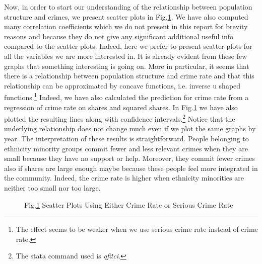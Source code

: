 \documentclass[a4paper,12pt]{article}
\begin{document}
\noindent
Now, in order to start our understanding of the relationship between population structure and crimes, we present scatter plots in Fig.\ref{scatters}. We have also computed many correlation coefficients which we do not present in this report for brevity reasons and because they do not give any significant additional useful info compared to the scatter plots. Indeed, here we prefer to present scatter plots for all the variables we are more interested in. It is already evident from these few graphs that something interesting is going on. More in particular, it seems that there is a relationship between population structure and crime rate and that this relationship can be approximated by concave functions, i.e. inverse u shaped functions.\footnote{The effect seems to be weaker when we use serious crime rate instead of crime rate.} Indeed, we have also calculated the prediction for crime rate from a regression of crime rate on shares and squared shares. In Fig.\ref{scatters} we have also plotted the resulting lines along with confidence intervals.\footnote{The stata command used is \textit{qfitci}.} Notice that the underlying relationship does not change much even if we plot the same graphs by year. The interpretation of these results is straightforward. People belonging to ethnicity minority groups commit fewer and less relevant crimes when they are small because they have no support or help. Moreover, they commit fewer crimes also if shares are large enough maybe because these people feel more integrated in the community. Indeed, the crime rate is higher when ethnicity minorities are neither too small nor too large.

\begin{figure}[H]
\caption{Fig.\ref{scatters} Scatter Plots Using Either Crime Rate or Serious Crime Rate}
\hspace*{.2in}
\label{scatters}
\end{figure}
\end{document}
